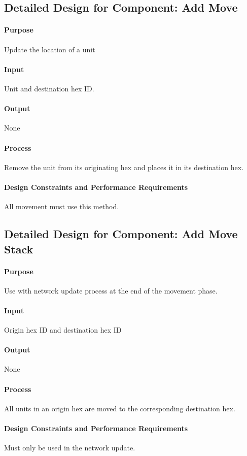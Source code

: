 \documentclass[12pt,a4paper,titlepage]{article}
\begin{document}
\subsection{Detailed Design for Component: Add Move}
\paragraph{Purpose} Update the location of a unit
\paragraph{Input} Unit and destination hex ID.
\paragraph{Output} None
\paragraph{Process} Remove the unit from its originating hex and places it in its destination hex.
\paragraph{Design Constraints and Performance Requirements} All movement must use this method.

\subsection{Detailed Design for Component: Add Move Stack}
\paragraph{Purpose} Use with network update process at the end of the movement phase.
\paragraph{Input} Origin hex ID and destination hex ID
\paragraph{Output} None
\paragraph{Process} All units in an origin hex are moved to the corresponding destination hex.
\paragraph{Design Constraints and Performance Requirements} Must only be used in the network update.
\end{document}
